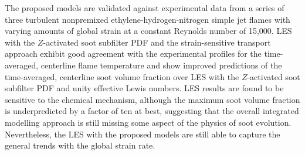 The proposed models are validated against experimental data from a series of three turbulent nonpremixed ethylene-hydrogen-nitrogen simple jet flames with varying amounts of global strain at a constant Reynolds number of 15,000. LES with the $Z$-activated soot subfilter PDF and the strain-sensitive transport approach exhibit good agreement with the experimental profiles for the time-averaged, centerline flame temperature and show improved predictions of the time-averaged, centerline soot volume fraction over LES with the $Z$-activated soot subfilter PDF and unity effective Lewis numbers. LES results are found to be sensitive to the chemical mechanism, although the maximum soot volume fraction is underpredicted by a factor of ten at best, suggesting that the overall integrated modelling approach is still missing some aspect of the physics of soot evolution. Nevertheless, the LES with the proposed models are still able to capture the general trends with the global strain rate. 




